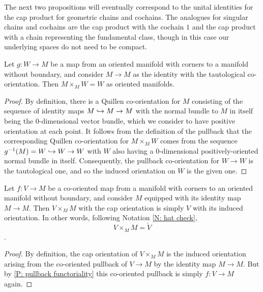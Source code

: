 The next two propositions will eventually correspond to the unital identities for the cap product for geometric chains and cochains.
The analogues for singular chains and cochains are the cap product with the cochain $1$ and the cap product with a chain representing the fundamental class, though in this case our underlying spaces do not need to be compact.

\begin{proposition}\label{P: cap with 1}
	Let $g \colon W \to M$ be a map from an oriented manifold with corners to a manifold without boundary, and consider $M \to M$ as the identity with the tautological co-orientation.
	Then $M \times_M W = W$ as oriented manifolds.
\end{proposition}

\begin{proof}
	By definition, there is a Quillen co-orientation for $M$ consisting of the sequence of identity maps $M \hookrightarrow M \to M$ with the normal bundle to $M$ in itself being the $0$-dimensional vector bundle, which we consider to have positive orientation at each point.
	It follows from the definition of the pullback that the corresponding Quillen co-orientation for $M \times_M W$ comes from the sequence $g^{-1}(M) = W \hookrightarrow W \to W$ with $W$ also having a $0$-dimensional positively-oriented normal bundle in itself.
	Consequently, the pullback co-orientation for $W \to W$ is the tautological one, and so the induced orientation on $W$ is the given one.
\end{proof}

\begin{proposition}\label{P: cap with identity M}
	Let $f \colon V \to M$ be a co-oriented map from a manifold with corners to an oriented manifold without boundary, and consider $M$ equipped with its identity map $M \to M$.
	Then $V \times_M M$ with the cap orientation is simply $V$ with its induced orientation.
	In other words, following Notation \ref{N: hat check},
	\[
	V \times_M M = \check V
	\].
\end{proposition}

\begin{proof}
	By definition, the cap orientation of $V \times_M M$ is the induced orientation arising from the co-oriented pullback of $V \to M$ by the identity map $M \to M$.
	But by \cref{P: pullback functoriality} this co-oriented pullback is simply $f \colon V \to M$ again.
\end{proof}

